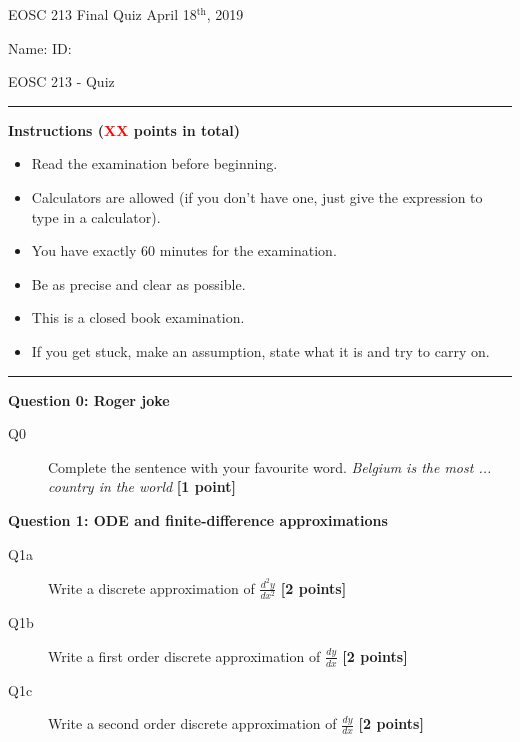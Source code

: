 \documentclass{article}
\begin{document}
\pagestyle{first}


\large{EOSC 213 Final Quiz} \hspace{10cm} \large{April 18$^{\textrm{th}}$, 2019}

\large{Name:} \hspace{12cm} \large{ID: }
\begin{center}
\Huge{EOSC 213 - Quiz}
\end{center}

\rule{\textwidth}{1pt}

\large{\textbf{Instructions (\textcolor{red}{XX} points in total)}}
\begin{multicols}{2}
\begin{itemize}
\item Read the examination before beginning.
\item Calculators are allowed (if you don't have one, just give the expression to type in a calculator).
\item You have exactly 60 minutes for the examination.
\item Be as precise and clear as possible.
\item This is a closed book examination.
\item If you get stuck, make an assumption, state what it is and try to carry on.
\end{itemize} 
\end{multicols}



\rule{\textwidth}{1pt}

\textbf{Question 0: Roger joke}

\begin{description}
\item [Q0] Complete the sentence with your favourite word. \textit{Belgium is the most ... country in the world}  \textbf{[1 point]}
\vspace{0.5cm}

\end{description}

\textbf{Question 1: ODE and finite-difference approximations}

\begin{description}
\item [Q1a] Write a discrete approximation of $\frac{d^2y}{dx^2}$ \textbf{[2 points]}
\vspace{3cm}
\item [Q1b] Write a first order discrete approximation of $\frac{dy}{dx}$ \textbf{[2 points]}
\vspace{3.5cm}

\item [Q1c] Write a second order discrete approximation of $\frac{dy}{dx}$ \textbf{[2 points]}
\vspace{3.5cm}

\end{description}
\end{document}
